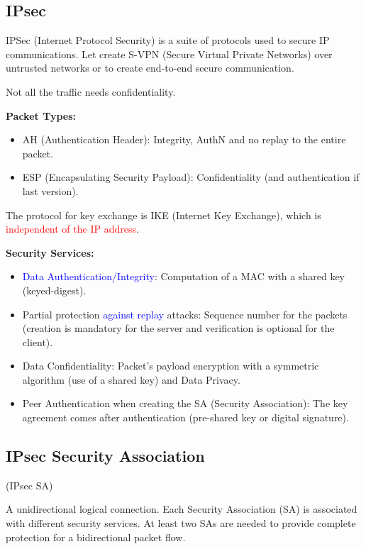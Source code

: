 \clearpage
\begin{center}
    \section{IPsec}
\end{center}
IPSec (Internet Protocol Security) is a suite of protocols used to secure IP communications. Let create S-VPN (Secure Virtual Private Networks) over untrusted networks or to create end-to-end secure communication. 

\hfill

\begin{tcolorbox}[colback=blue!10!white, colframe=blue!50!white, title=Reminder] 
    Not all the traffic needs confidentiality.
\end{tcolorbox}

\hfill

\textbf{Packet Types:}
\begin{itemize}
    \item AH (Authentication Header): Integrity, AuthN and no replay to the entire packet.
    \item ESP (Encapsulating Security Payload): Confidentiality (and authentication if last version).
\end{itemize}

The protocol for key exchange is IKE (Internet Key Exchange), which is \textcolor{red}{independent of the IP address}.

\hfill 

\textbf{Security Services:}
\begin{itemize}
    \item \textcolor{Blue}{Data Authentication/Integrity}: Computation of a MAC  with a shared key (keyed-digest). 
    \item Partial protection \textcolor{Blue}{against replay} attacks: Sequence number for the packets (creation is mandatory for the server and verification is optional for the client).
    \item Data Confidentiality: Packet's payload encryption with a symmetric algorithm (use of a shared key) and Data Privacy.
    \item Peer Authentication when creating the SA (Security Association): The key agreement comes after authentication (pre-shared key or digital signature).
\end{itemize}

\subsection{IPsec Security Association}
\begin{center}
    (IPsec SA)
\end{center}
A unidirectional logical connection. Each Security Association (SA) is associated with different security services. At least two SAs are needed to provide complete protection for a bidirectional packet flow.


